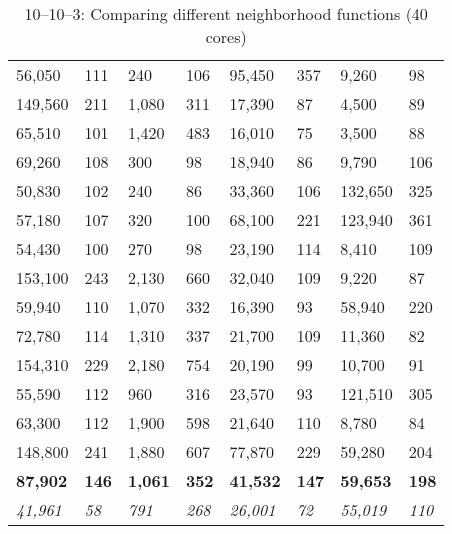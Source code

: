 \begin{table}[h]
\begin{tabular}{R{1.5cm}R{1.5cm}|R{1.5cm}R{1.5cm}|R{1.5cm}R{1.5cm}|R{1.5cm}R{1.5cm}}
56,050 & 111 & 240 & 106 & 95,450 & 357 & 9,260 & 98 \\   
149,560 & 211 & 1,080 & 311 & 17,390 & 87 & 4,500 & 89 \\   
65,510 & 101 & 1,420 & 483 & 16,010 & 75 & 3,500 & 88 \\   
69,260 & 108 & 300 & 98 & 18,940 & 86 & 9,790 & 106 \\   
50,830 & 102 & 240 & 86 & 33,360 & 106 & 132,650 & 325 \\   
57,180 & 107 & 320 & 100 & 68,100 & 221 & 123,940 & 361 \\   
54,430 & 100 & 270 & 98 & 23,190 & 114 & 8,410 & 109 \\   
153,100 & 243 & 2,130 & 660 & 32,040 & 109 & 9,220 & 87 \\   
59,940 & 110 & 1,070 & 332 & 16,390 & 93 & 58,940 & 220 \\   
72,780 & 114 & 1,310 & 337 & 21,700 & 109 & 11,360 & 82 \\   
154,310 & 229 & 2,180 & 754 & 20,190 & 99 & 10,700 & 91 \\   
55,590 & 112 & 960 & 316 & 23,570 & 93 & 121,510 & 305 \\   
63,300 & 112 & 1,900 & 598 & 21,640 & 110 & 8,780 & 84 \\   
148,800 & 241 & 1,880 & 607 & 77,870 & 229 & 59,280 & 204 \\ 
\hline   
\textbf{87,902} & \textbf{146} & \textbf{1,061} & \textbf{352} & \textbf{41,532} & \textbf{147} & \textbf{59,653} & \textbf{198} \\   
\textit{41,961} & \textit{58} & \textit{791} & \textit{268} & \textit{26,001} & \textit{72} & \textit{55,019} & \textit{110} \\  
\hline  
\end{tabular}
\caption{\sg{} 10--10--3: Comparing different neighborhood functions (40 cores)}\label{subtab:gr_tabu_comm}
\end{table}